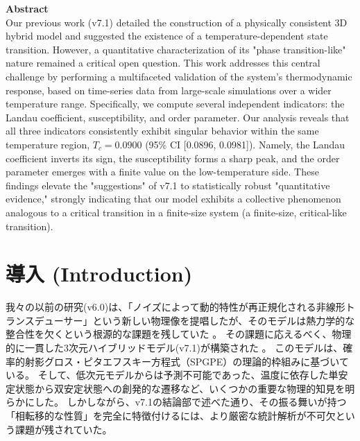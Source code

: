 \documentclass[a4paper,11pt,ja=standard,lualatex]{bxjsarticle}
\begin{document}
\vspace{1em}

\noindent\textbf{Abstract}\\
\small
Our previous work (v7.1) detailed the construction of a physically consistent 3D hybrid model and suggested the existence of a temperature-dependent state transition. 
However, a quantitative characterization of its "phase transition-like" nature remained a critical open question. 
This work addresses this central challenge by performing a multifaceted validation of the system's thermodynamic response, based on time-series data from large-scale simulations over a wider temperature range. 
Specifically, we compute several independent indicators: the Landau coefficient, susceptibility, and order parameter. 
Our analysis reveals that all three indicators consistently exhibit singular behavior within the same temperature region, $T_c = 0.0900$ (95\% CI [0.0896, 0.0981]). 
Namely, the Landau coefficient inverts its sign, the susceptibility forms a sharp peak, and the order parameter emerges with a finite value on the low-temperature side. 
These findings elevate the "suggestions" of v7.1 to statistically robust "quantitative evidence," strongly indicating that our model exhibits a collective phenomenon analogous to a critical transition in a finite-size system (a finite-size, critical-like transition).
\normalsize

\FloatBarrier

\section{導入 (Introduction)}
\label{sec:introduction}
我々の以前の研究(v6.0)は、「ノイズによって動的特性が再正規化される非線形トランスデューサー」という新しい物理像を提唱したが、そのモデルは熱力学的な整合性を欠くという根源的な課題を残していた \cite{Konno2025v6}。
その課題に応えるべく、物理的に一貫した3次元ハイブリッドモデル(v7.1)が構築された \cite{Konno2025v7, Blakie2008}。
このモデルは、確率的射影グロス・ピタエフスキー方程式（SPGPE）の理論的枠組みに基づいている。
そして、低次元モデルからは予測不可能であった、温度に依存した単安定状態から双安定状態への創発的な遷移など、いくつかの重要な物理的知見を明らかにした。
しかしながら、v7.1\!の結論部で述べた通り、その振る舞いが持つ「相転移的な性質」を完全に特徴付けるには、より厳密な統計解析が不可欠という課題が残されていた。
\end{document}
